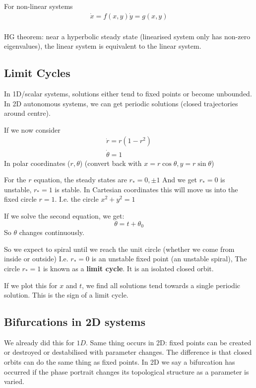\documentclass{/home/janmebows/Documents/LatexTemplates/myassignment}
\begin{document}
For non-linear systems
\begin{align*}
    \dot{x} = f(x,y)
    \dot{y} = g(x,y)\\
\end{align*}

HG theorem: near a hyperbolic steady state (linearised system only has non-zero eigenvalues), the linear system is equivalent to the linear system.



\subsection{Limit Cycles}
In 1D/scalar systems, solutions either tend to fixed points or become unbounded.\\
In 2D autonomous systems, we can get periodic solutions (closed trajectories around centre).

If we now consider
\begin{align*}
    \dot{r} = r(1-r^2)\\
    \dot{\theta} = 1
\end{align*}
In polar coordinates ($r,\theta$) (convert back with $x = r\cos\theta, y= r\sin \theta$)

For the $r$ equation, the steady states are $r_* = 0,\pm1 $
And we get $r_* = 0$ is unstable, $r_* = 1$ is stable.
In Cartesian coordinates this will move us into the fixed circle $r=1$. I.e. the circle $x^2 + y^2 = 1$

If we solve the second equation, we get:
\[\theta = t + \theta_0\]
So $\theta$ changes continuously.

So we expect to spiral until we reach the unit circle (whether we come from inside or outside)
I.e. $r_* =0$ is an unstable fixed point (an unstable spiral), 
The circle $r_*=1$ is known as a \textbf{limit cycle}. It is an isolated closed orbit.


If we plot this for $x$ and $t$, we find all solutions tend towards a single periodic solution. This is the sign of a limit cycle.


\subsection{Bifurcations in 2D systems}
We already did this for $1D$. Same thing occurs in 2D: fixed points can be created or destroyed or destabilised with parameter changes. The difference is that closed orbits can do the same thing as fixed points. In 2D we say a bifurcation has occurred if the phase portrait changes its topological structure as a parameter is varied. 
\end{document}
